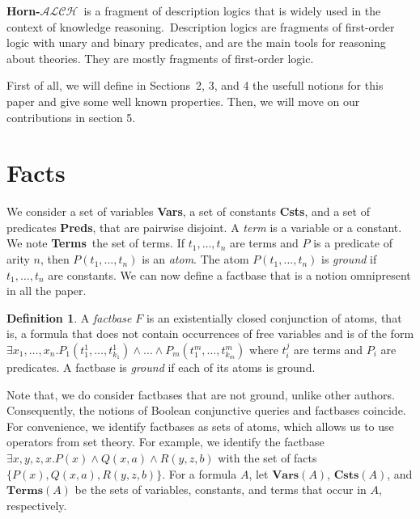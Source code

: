 \documentclass{article}
\theoremstyle{definition}
\newtheorem{definition}{Definition}[section]
\theoremstyle{remark}
\newcommand{\Vars}{\textbf{Vars}}
\newcommand{\Terms}{\textbf{Terms}}
\newcommand{\Preds}{\textbf{Preds}}
\newcommand{\Csts}{\textbf{Csts}}
\newcommand{\ALCH}{\textbf{Horn-$\mathcal{ALCH}$}}
\begin{document}
\ALCH\ is a fragment of description logics that is widely used in the context of
knowledge reasoning.\  Description logics are fragments of first-order logic with unary and binary predicates, and are the main tools for reasoning about theories. They are mostly fragments of first-order logic.

First of all, we will define in Sections~2, 3, and 4 the usefull notions for this paper and give some well known properties. Then, we will move on our contributions in section 5. 


\section{Facts}


We consider a set of variables \Vars, a set of constants \Csts, and a set of predicates \Preds, that are pairwise disjoint. A \emph{term} is a variable or a constant. We note \Terms\ the set of terms. If $t_1,\ldots,t_n$ are terms and $P$ is a predicate of arity $n$, then $P(t_{1},\ldots,t_{n})$ is an \emph{atom}. The atom $P(t_{1},\ldots,t_{n})$ is \emph{ground} if $t_1,\ldots,t_n$ are constants. We can now define a factbase that is a notion omnipresent in all the paper.  


\begin{definition}
A \emph{factbase} $F$ is an existentially closed conjunction of atoms, that is, a formula that does not contain occurrences of free variables and is of the form $\exists x_{1},\ldots,x_{n}.P_{1}(t_{1}^{1},\ldots,t_{k_{1}}^{1})\land \ldots\land P_{m}(t_{1}^{m},\ldots,t_{k_{m}}^{m})$ where $t_i^j$ are terms and $P_i$ are predicates. A factbase is \emph{ground} if each of its atoms is ground.
\end{definition}

Note that, we do consider factbases that are not ground, unlike other authors. Consequently, the notions of Boolean conjunctive queries and factbases coincide. For convenience, we identify factbases as sets of atoms, which allows us to  use operators from set theory. For example, we identify the factbase $\exists x,y,z,x. P(x) \land Q(x,a) \land R(y,z,b)$ with the set of facts $\{P(x),Q(x,a),R(y,z,b)\}$. For a formula $A$, let \emph{$\Vars(A)$}, \emph{$\Csts(A)$}, and \emph{$\Terms(A)$} be the sets of variables, constants, and terms that occur in $A$, respectively.
\end{document}

